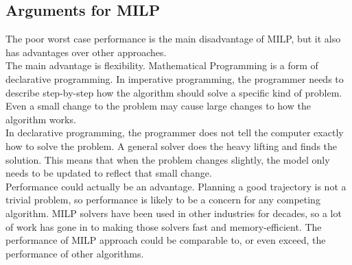 \subsection{Arguments for MILP}
The poor worst case performance is the main disadvantage of MILP, but it also has advantages over other approaches. \\
The main advantage is flexibility. Mathematical Programming is a form of declarative programming. In imperative programming, the programmer needs to describe step-by-step how the algorithm should solve a specific kind of problem. Even a small change to the problem may cause large changes to how the algorithm works.\\
In declarative programming, the programmer does not tell the computer exactly how to solve the problem. A general solver does the heavy lifting and finds the solution. This means that when the problem changes slightly, the model only needs to be updated to reflect that small change. \\
Performance could actually be an advantage. Planning a good trajectory is not a trivial problem, so performance is likely to be a concern for any competing algorithm. MILP solvers have been used in other industries for decades, so a lot of work has gone in to making those solvers fast and memory-efficient. The performance of MILP approach could be comparable to, or even exceed, the performance of other algorithms.

